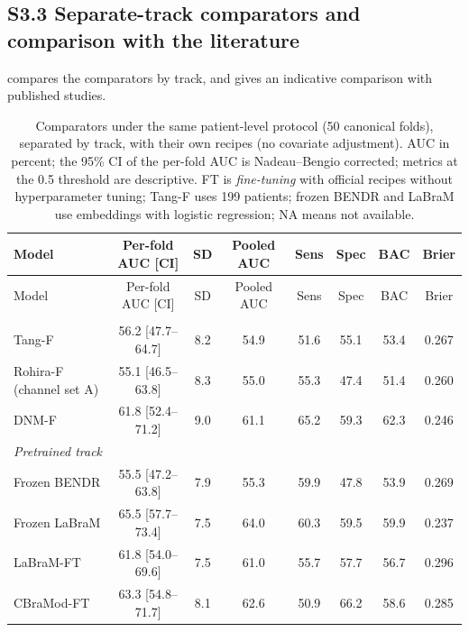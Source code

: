 \subsection*{S3.3 Separate-track comparators and comparison with the literature}
 compares the comparators by track, and  gives an indicative comparison with published studies.

{\scriptsize
\setlength{\tabcolsep}{3.2pt}
\begin{longtable}{p{}ccccccc}
\caption{Comparators under the same patient-level protocol (50 canonical folds), separated by track, with their own recipes (no covariate adjustment). AUC in percent; the 95\% CI of the per-fold AUC is Nadeau--Bengio corrected; metrics at the 0.5 threshold are descriptive. FT is \textit{fine-tuning} with official recipes without hyperparameter tuning; Tang-F uses 199 patients; frozen BENDR and LaBraM use embeddings with logistic regression; NA means not available.}\label{tab:pembanding}\\
\toprule
Model & Per-fold AUC [CI] & SD & Pooled AUC & Sens & Spec & BAC & Brier \\
\midrule
\endfirsthead
\toprule
Model & Per-fold AUC [CI] & SD & Pooled AUC & Sens & Spec & BAC & Brier \\
\midrule
\endhead
\bottomrule
\endfoot
\multicolumn{8}{l}{\textit{From-scratch track: reproduced published methods}} \\
Tang-F & 56.2 [47.7--64.7] & 8.2 & 54.9 & 51.6 & 55.1 & 53.4 & 0.267 \\
Rohira-F (channel set A) & 55.1 [46.5--63.8] & 8.3 & 55.0 & 55.3 & 47.4 & 51.4 & 0.260 \\
DNM-F & 61.8 [52.4--71.2] & 9.0 & 61.1 & 65.2 & 59.3 & 62.3 & 0.246 \\
\midrule
\multicolumn{8}{l}{\textit{\textit{Pretrained} track}} \\
Frozen BENDR & 55.5 [47.2--63.8] & 7.9 & 55.3 & 59.9 & 47.8 & 53.9 & 0.269 \\
Frozen LaBraM & 65.5 [57.7--73.4] & 7.5 & 64.0 & 60.3 & 59.5 & 59.9 & 0.237 \\
LaBraM-FT & 61.8 [54.0--69.6] & 7.5 & 61.0 & 55.7 & 57.7 & 56.7 & 0.296 \\
CBraMod-FT & 63.3 [54.8--71.7] & 8.1 & 62.6 & 50.9 & 66.2 & 58.6 & 0.285 \\
\end{longtable}
}


